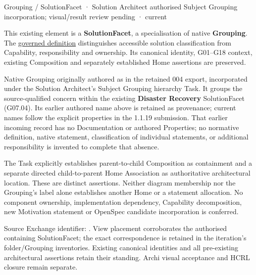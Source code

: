 \label{element:f7d9c92661ed44af99516400635041bf}
{\small Grouping / SolutionFacet · Solution Architect authorised Subject Grouping incorporation; visual/result review pending · current}\par

This existing element is a \textbf{SolutionFacet}, a specialisation of native
\textbf{Grouping}. The \href{\detokenize{../../../../../../../governance/continuum-representation.md#solutionfacet-classification--1119-candidate}}{governed definition}
distinguishes accessible solution classification from Capability, responsibility
and ownership. Its canonical identity, G01–G18 context, existing Composition
and separately established Home assertions are preserved.



Native Grouping originally authored as \texttt{} in the retained 004 export,
incorporated under the Solution Architect's Subject Grouping hierarchy Task.
It groups the source-qualified \texttt{} concern within
the existing \textbf{Disaster Recovery} SolutionFacet (G07.04). Its earlier authored name above is retained as provenance; current names
follow the explicit properties in the 1.1.19 submission.
That earlier incoming record has no Documentation or authored Properties; no normative
definition, native statement, classification of individual statements, or
additional responsibility is invented to complete that absence.



The Task explicitly establishes parent-to-child Composition as containment and
a separate directed child-to-parent Home Association as authoritative architectural
location. These are distinct assertions. Neither diagram membership nor the
Grouping's label alone establishes another Home or a statement allocation.
No component ownership, implementation dependency, Capability decomposition,
new Motivation statement or OpenSpec candidate incorporation is conferred.



Source Exchange identifier: \texttt{}. View placement corroborates
the authorised containing SolutionFacet; the exact correspondence is retained in the
iteration's folder/Grouping inventories. Existing canonical identities and all
pre-existing architectural assertions retain their standing. Archi visual
acceptance and HCRL closure remain separate.


